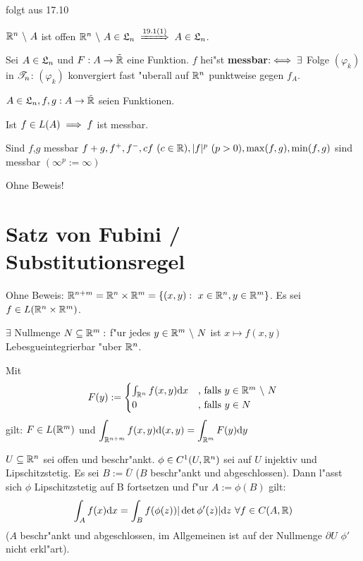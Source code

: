 \documentclass[a4paper,twoside,DIV15,BCOR12mm]{scrbook}
\begin{document}
\begin{beweise}
\item folgt aus 17.10
\item $\mathbb{R}^n\ \backslash\ A$ ist offen  $\MdR^n\ \backslash\ A\in\L_n\folgtnach{19.1(1)}A\in\L_n$.
\end{beweise}

\begin{definition}
Sei $A\in\mathfrak{L}_n$ und $F:A\to\tilde{\mathbb{R}}$ eine Funktion. $f$ hei"st \textbf{messbar}$:\iff\exists$ Folge $(\varphi_k)$ in $\mathscr{T}_n$: $(\varphi_k)$ konvergiert fast "uberall auf $\mathbb{R}^n$ punktweise gegen $f_A$.
\end{definition}

\begin{satz}
$A\in\mathfrak{L}_n, f,g:A\to\tilde{\mathbb{R}}$ seien Funktionen.
\begin{liste}
\item Ist $f\in L(A)\implies f$ ist messbar.
\item Sind $f$,$g$ messbar \folgt $f+g, f^{+}, f^{-}, cf\ (c\in\mathbb{R}), |f|^p\ (p>0), \max(f,g), \min(f,g)$ sind messbar $(\infty^p:=\infty)$
\end{liste}
Ohne Beweis!
\end{satz}

\chapter{Satz von Fubini / Substitutionsregel}

\begin{satz}
Ohne Beweis:
$\mathbb{R}^{n+m}=\mathbb{R}^n\times\mathbb{R}^m=\{(x,y):\ x\in\mathbb{R}^n, y\in\mathbb{R}^m\}$. Es sei $f\in L(\mathbb{R}^n\times\mathbb{R}^m)$.
\begin{liste}
\item $\exists$ Nullmenge $N\subseteq\mathbb{R}^m:$ f"ur jedes $y\in\mathbb{R}^m\ \backslash\ N$ ist $x\mapsto f(x,y)$ Lebesgueintegrierbar "uber $\mathbb{R}^n$.
\item Mit
\[
	F(y):=\begin{cases}
		\int_{\MdR^n}f(x,y)\text{d}x&\text{, falls } y\in\MdR^m\ \backslash\ N\\
		0 &\text{, falls } y\in N
	\end{cases}
\]
gilt: $F\in L(\mathbb{R}^m)$ und $\displaystyle\int_{\mathbb{R}^{n+m}}f(x,y)\text{d}(x,y)=\displaystyle\int_{\mathbb{R}^m}F(y)\text{d}y$
\end{liste}
\end{satz}

\begin{satz}[Substitutionsregel]
$U\subseteq\mathbb{R}^n$ sei offen und beschr"ankt. $\phi\in C^1(U,\mathbb{R}^n)$ sei auf $U$ injektiv und Lipschitzstetig. Es sei $B:=\bar{U}$
($B$ beschr"ankt und abgeschlossen). Dann l"asst sich $\phi$ Lipschitzstetig auf B fortsetzen und f"ur $A:=\phi(B)$ gilt:
\[
	\int_A f(x)\text{d}x=\int_B f(\phi(z))|\det\phi'(z)|\text{d}z\ \forall f\in C(A,\mathbb{R})
\]
($A$ beschr"ankt und abgeschlossen, im Allgemeinen ist auf der Nullmenge $\partial U$ $\phi'$ nicht erkl"art).
\end{satz}
\end{document}
